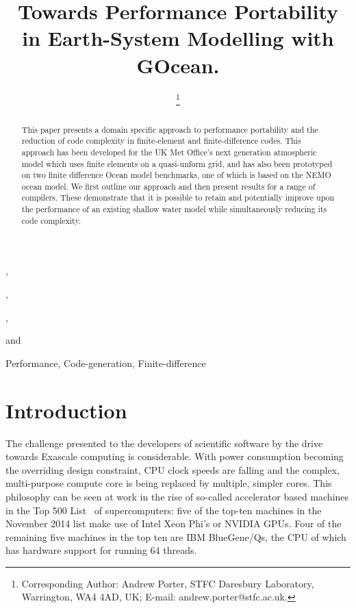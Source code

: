 \documentclass{IOS-Book-Article}
\def\hb{\hbox to 10.7 cm{}}
\begin{document}
\pagestyle{headings}
\def\thepage{}

\begin{frontmatter}              %

\title{Towards Performance Portability in Earth-System Modelling with GOcean.}

\markboth{}{November 2015\hb}

\author[A]{ %
\thanks{Corresponding Author: Andrew Porter, STFC Daresbury Laboratory, Warrington, WA4 4AD, UK; E-mail:
andrew.porter@stfc.ac.uk.}},
\author[A]{ },
\author[A]{ },
\author[A]{ }
and
\author[B]{ }
\address[A]{STFC Daresbury Laboratory, Warrington, WA4 4AD, UK}
\address[B]{IBM India}

\begin{abstract}
This paper presents a domain specific approach to performance
portability and the reduction of code complexity in finite-element and
finite-difference codes. This approach has been developed for the UK
Met Office's next generation atmospheric model which uses finite
elements on a quasi-unform grid, and has also been prototyped on two
finite difference Ocean model benchmarks, one of which is based on the
NEMO ocean model. We first outline our approach and then present
results for a range of compilers. These demonstrate that it is
possible to retain and potentially improve upon the performance of an
existing shallow water model while simultaneously reducing its code
complexity.
\end{abstract}

\begin{keyword}
Performance, Code-generation, Finite-difference
\end{keyword}

\end{frontmatter}
\markboth{November 2015\hb}{November 2015\hb}

\section*{Introduction}

The challenge presented to the developers of scientific software by
the drive towards Exascale computing is considerable. With power
consumption becoming the overriding design constraint, CPU clock
speeds are falling and the complex, multi-purpose compute core is
being replaced by multiple, simpler cores. This philosophy can be seen
at work in the rise of so-called accelerator based machines in the Top
500 List~\cite{top500} of supercomputers: five of the top-ten machines
in the November 2014 list make use of Intel Xeon Phi's or NVIDIA
GPUs. Four of the remaining five machines in the top ten are IBM
BlueGene/Qs, the CPU of which has hardware support for running 64
threads.
\end{document}

